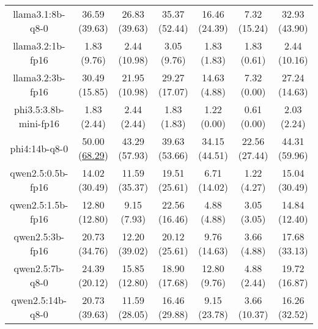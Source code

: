 \begin{table}[hbp]
{\begin{tabular}{ccccccc}
      \multicolumn{1}{c|}{llama3.1:8b-q8-0} & 36.59 (39.63) & 26.83 (39.63) & \multicolumn{1}{c|}{35.37 (52.44)} & 16.46 (24.39) & \multicolumn{1}{c|}{7.32 (15.24)} & 32.93 (43.90) \\


      \multicolumn{1}{c|}{llama3.2:1b-fp16} & 1.83 (9.76) & 2.44 (10.98) & \multicolumn{1}{c|}{3.05 (9.76)} & 1.83 (1.83) & \multicolumn{1}{c|}{1.83 (0.61)} & 2.44 (10.16) \\


      \multicolumn{1}{c|}{llama3.2:3b-fp16} & 30.49 (15.85) & 21.95 (10.98) & \multicolumn{1}{c|}{29.27 (17.07)} & 14.63 (4.88) & \multicolumn{1}{c|}{7.32 (0.00)} & 27.24 (14.63) \\


      \multicolumn{1}{c|}{phi3.5:3.8b-mini-fp16} & 1.83 (2.44) & 2.44 (2.44) & \multicolumn{1}{c|}{1.83 (1.83)} & 1.22 (0.00) & \multicolumn{1}{c|}{0.61 (0.00)} & 2.03 (2.24) \\


      \multicolumn{1}{c|}{phi4:14b-q8-0} & 50.00 (\underline{68.29}) & 43.29 (57.93) & \multicolumn{1}{c|}{39.63 (53.66)} & 34.15 (44.51) & \multicolumn{1}{c|}{22.56 (27.44)} & 44.31 (59.96) \\


      \multicolumn{1}{c|}{qwen2.5:0.5b-fp16} & 14.02 (30.49) & 11.59 (35.37) & \multicolumn{1}{c|}{19.51 (25.61)} & 6.71 (14.02) & \multicolumn{1}{c|}{1.22 (4.27)} & 15.04 (30.49) \\


      \multicolumn{1}{c|}{qwen2.5:1.5b-fp16} & 12.80 (12.80) & 9.15 (7.93) & \multicolumn{1}{c|}{22.56 (16.46)} & 4.88 (4.88) & \multicolumn{1}{c|}{3.05 (3.05)} & 14.84 (12.40) \\


      \multicolumn{1}{c|}{qwen2.5:3b-fp16} & 20.73 (34.76) & 12.20 (39.02) & \multicolumn{1}{c|}{20.12 (25.61)} & 9.76 (14.63) & \multicolumn{1}{c|}{3.66 (4.88)} & 17.68 (33.13) \\


      \multicolumn{1}{c|}{qwen2.5:7b-q8-0} & 24.39 (20.12) & 15.85 (12.80) & \multicolumn{1}{c|}{18.90 (17.68)} & 12.80 (9.76) & \multicolumn{1}{c|}{4.88 (2.44)} & 19.72 (16.87) \\


      \multicolumn{1}{c|}{qwen2.5:14b-q8-0} & 20.73 (39.63) & 11.59 (28.05) & \multicolumn{1}{c|}{16.46 (29.88)} & 9.15 (23.78) & \multicolumn{1}{c|}{3.66 (10.37)} & 16.26 (32.52) \\



\end{tabular}}
\end{table}
